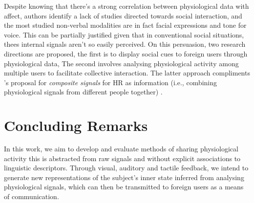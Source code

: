 Despite knowing that there's a strong correlation between physiological data with affect, authors identify a lack of studies directed towards social interaction, and the most studied non-verbal modalities are in fact facial expressions and tone for voice. This can be partially justified given that in conventional social situations, thees internal signals aren't so easily perceived. On this persuasion, two research directions are proposed, the first is to display social cues to foreign users through physiological data, The second involves analysing physiological activity among multiple users to facilitate collective interaction. The latter approach compliments \citeauthor{slovak_understanding_2012}'s proposal for \textit{composite signals} for HR as information (i.e., combining physiological signals from different people together) \cite{slovak_understanding_2012}.




\section{Concluding Remarks}
\label{lit_review:conclusion}

In this work, we aim to develop and evaluate methods of sharing physiological activity this is abstracted from raw signals and without explicit associations to linguistic descriptors. Through visual, auditory and tactile feedback, we intend to generate new representations of the subject's inner state inferred from analysing physiological signals, which can then be transmitted to foreign users as a means of communication.


